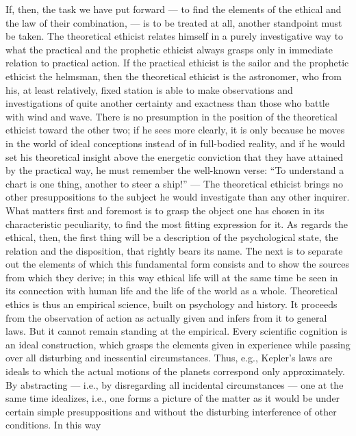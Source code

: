 \documentclass[12pt,a4paper,openany]{book}
\newcommand{\opage}[1]{\marginnote{\footnotesize\textit{[#1]}}}
\begin{document}
If, then, the task we have put forward --- to find the elements of the
ethical and the law of their combination, --- is to be treated at all,
another standpoint must be taken. The theoretical ethicist relates himself
in a purely investigative way to what the practical and the prophetic
\opage{4}ethicist always grasps only in immediate relation to practical
action. If the practical ethicist is the sailor and the prophetic ethicist
the helmsman, then the theoretical ethicist is the astronomer, who from his,
at least relatively, fixed station is able to make observations and
investigations of quite another certainty and exactness than those who
battle with wind and wave. There is no presumption in the position of the
theoretical ethicist toward the other two; if he sees more clearly, it is
only because he moves in the world of ideal conceptions instead of in full-bodied
reality, and if he would set his theoretical insight above the energetic
conviction that they have attained by the practical way, he must remember
the well-known verse: ``To understand a chart is one thing, another to steer
a ship!'' --- %
The theoretical ethicist brings no other presuppositions to the subject he
would investigate than any other inquirer. What matters first and foremost
is to grasp the object one has chosen in its characteristic peculiarity, to
find the most fitting expression for it. As regards the ethical, then, the
first thing will be a description of the psychological state, the relation
and the disposition, that rightly bears its name. The next is to separate
out the elements of which this fundamental form consists and to show the
sources from which they derive; in this way ethical life will at the same
time be seen in its connection with human life and the life of the world as
a whole. Theoretical ethics is thus an empirical science, built on
psychology and history. It proceeds from the observation of action as
actually given and infers from it to general laws. But it cannot remain
standing at the empirical. Every scientific cognition is an ideal
construction, which grasps the elements given in experience while passing
over all disturbing and inessential circumstances. Thus, e.g., Kepler's laws
are ideals to which the actual motions of the planets correspond only
approximately. By abstracting --- \opage{5}i.e., by disregarding all
incidental circumstances --- one at the same time idealizes, i.e., one forms
a picture of the matter as it would be under certain simple presuppositions
and without the disturbing interference of other conditions. In this way
\end{document}
